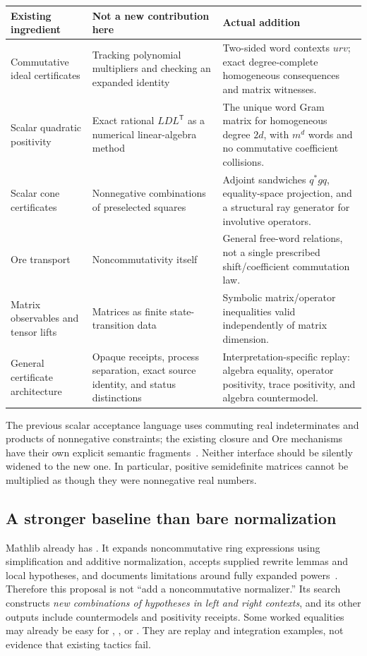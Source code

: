 \begin{longtable}{@{}p{}p{}p{}@{}}
\toprule Existing ingredient & Not a new contribution here & Actual addition \\\midrule\endhead
Commutative ideal certificates & Tracking polynomial multipliers and checking
an expanded identity & Two-sided word contexts $u r v$; exact degree-complete
homogeneous consequences and matrix witnesses. \\
Scalar quadratic positivity & Exact rational $LDL^{\mathsf T}$ as a numerical
linear-algebra method & The unique word Gram matrix for homogeneous degree
$2d$, with $m^d$ words and no commutative coefficient collisions. \\
Scalar cone certificates & Nonnegative combinations of preselected squares &
Adjoint sandwiches $q^*gq$, equality-space projection, and a structural ray
generator for involutive operators. \\
Ore transport & Noncommutativity itself & General free-word relations, not a
single prescribed shift/coefficient commutation law. \\
Matrix observables and tensor lifts & Matrices as finite state-transition data &
Symbolic matrix/operator inequalities valid independently of matrix dimension. \\
General certificate architecture & Opaque receipts, process separation, exact
source identity, and status distinctions & Interpretation-specific replay:
algebra equality, operator positivity, trace positivity, and algebra countermodel. \\
\bottomrule
\end{longtable}

The previous scalar acceptance language uses commuting real indeterminates and
products of nonnegative constraints; the existing closure and Ore mechanisms
have their own explicit semantic fragments~\cite{forge-nonlinear,forge-closure}.
Neither interface should be silently widened to the new one. In particular,
positive semidefinite matrices cannot be multiplied as though they were
nonnegative real numbers.

\subsection{A stronger baseline than bare normalization}

Mathlib already has . It expands noncommutative ring
expressions using simplification and additive normalization, accepts supplied
rewrite lemmas and local hypotheses, and documents limitations around fully
expanded powers~\cite{noncomm-ring}. Therefore this proposal is not ``add a
noncommutative normalizer.'' Its search constructs \emph{new combinations of
hypotheses in left and right contexts}, and its other outputs include
countermodels and positivity receipts. Some worked equalities may already be
easy for , , or . They are
replay and integration examples, not evidence that existing tactics fail.

